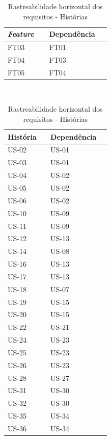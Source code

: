 \begin{table}[!h]
\centering
\label{horizontal}
\caption{Rastreabilidade horizontal dos requisitos - \textit{Features}}
\begin{tabular}{p{0.20\linewidth}p{0.20\linewidth}}
  \hline
  \textit{Feature}  & Dependência \\
  \hline
      FT03& FT01\\
      FT04& FT03 \\
      FT05& FT04 \\
  \hline
  \end{tabular}
\\
\label{horizontal2}
\caption{Rastreabilidade horizontal dos requisitos - Histórias}
\begin{tabular}{p{0.20\linewidth}p{0.20\linewidth}}
  \hline
  História  & Dependência \\
  \hline
      US-02 & US-01\\
      US-03 & US-01\\
      US-04 & US-02\\
      US-05 & US-02\\
      US-06 & US-02\\
      US-10 & US-09\\
      US-11 & US-09\\
      US-12 & US-13\\
      US-14 & US-08\\
      US-16 & US-13\\
      US-17 & US-13\\
      US-18 & US-07\\
      US-19 & US-15\\
      US-20 & US-15\\
      US-22 & US-21\\
      US-24 & US-23\\
      US-25 & US-23\\
      US-26 & US-23\\
      US-28 & US-27\\
      US-31 & US-30\\
      US-32 & US-30\\
      US-35 & US-34\\
      US-36 & US-34\\ 
   \hline
  \end{tabular}
\end{table}



